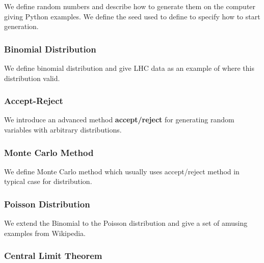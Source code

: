 We define random numbers and describe how to generate them on the
computer giving Python examples. We define the seed used to define to
specify how to start generation.



\subsubsection{Binomial Distribution}


We define binomial distribution and give LHC data as an example of where
this distribution valid.


\subsubsection{Accept-Reject}

We introduce an advanced method \textbf{accept/reject} for generating
random variables with arbitrary distributions.


\subsubsection{Monte Carlo Method}

We define Monte Carlo method which usually uses accept/reject method in
typical case for distribution.


\subsubsection{Poisson Distribution}

We extend the Binomial to the Poisson distribution and give a set of
amusing examples from Wikipedia.


\subsubsection{Central Limit Theorem}

